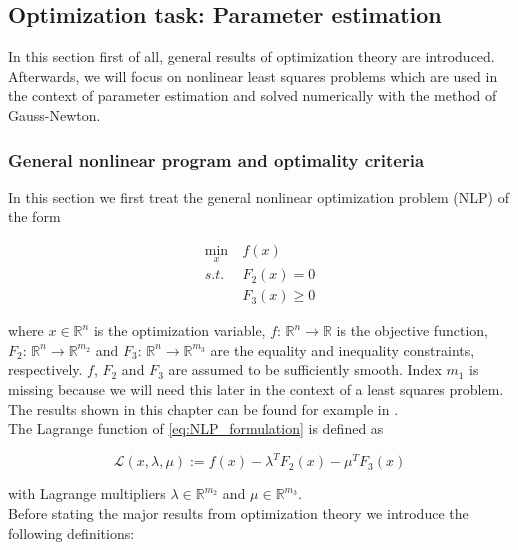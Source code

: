 \documentclass{scrartcl}[12pt, halfparskip]
\numberwithin{equation}{section}
\numberwithin{figure}{section}
\numberwithin{table}{section}
\begin{document}
\subsection{Optimization task: Parameter estimation}

In this section first of all, general results of optimization theory are introduced. Afterwards, we will focus on nonlinear least squares problems which are used in the context of parameter estimation and solved numerically with the method of Gauss-Newton.

\subsubsection{General nonlinear program and optimality criteria}
\label{sec:optimization_theory_NLP}
In this section we first treat the general nonlinear optimization problem (NLP) of the form

\begin{align}
	\min_x & \ f(x) \label{eq:NLP_formulation} \\
	s.t. & \ F_2(x) = 0 \nonumber \\
	& \ F_3(x) \ge 0 \nonumber
\end{align}

\vspace{-1cm}
where $x \in \mathbb{R}^n$ is the optimization variable, $f\text{: } \mathbb{R}^n \rightarrow \mathbb{R}$ is the objective function, $F_2\text{: } \mathbb{R}^n \rightarrow \mathbb{R}^{m_2}$ and $F_3\text{: } \mathbb{R}^n \rightarrow \mathbb{R}^{m_3}$ are the equality and inequality constraints, respectively. $f$, $F_2$ and $F_3$ are assumed to be sufficiently smooth. Index $m_1$ is missing because we will need this later in the context of a least squares problem. The results shown in this chapter can be found for example in \cite{nonlinear_optimiziation_wright}. \\

The Lagrange function of \cref{eq:NLP_formulation} is defined as

\begin{equation}
	\mathcal{L}(x,\lambda,\mu) := f(x) - \lambda^T F_2(x) - \mu^T F_3(x)
\end{equation}

with Lagrange multipliers $\lambda \in \mathbb{R}^{m_2}$ and $\mu \in \mathbb{R}^{m_3}$. \\

Before stating the major results from optimization theory we introduce the following definitions:
\end{document}
